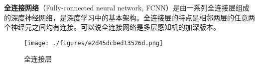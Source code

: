 

\textbf{全连接网络}（Fully-connected neural network, FCNN）是由一系列全连接层组成的深度神经网络，是深度学习中的基本架构。全连接层的特点是相邻两层的任意两个神经元之间均有连接。可以说全连接网络是多层感知机的加深版本。

\begin{figure}[ht]
\centering
\texttt{[image: ./figures/e2d45dcbed13526d.png]}
\caption{全连接层} \label{fig_FCNN_1}
\end{figure}